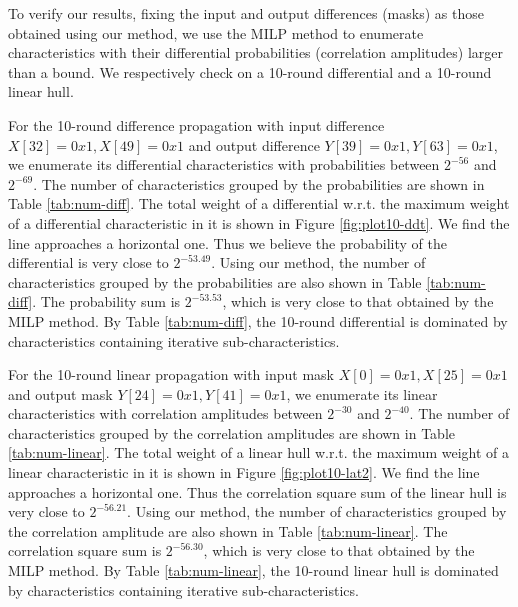 To verify our results, fixing the input and output differences (masks) as those obtained using our method, we use the MILP method to enumerate characteristics with their differential probabilities (correlation amplitudes) larger than a bound. We respectively check on a 10-round differential and a 10-round linear hull.

For the 10-round difference propagation with input difference $X[32]=0x1, X[49]=0x1$ and output difference $Y[39]=0x1, Y[63]=0x1$, we enumerate its differential characteristics with probabilities between $2^{-56}$ and $2^{-69}$. The number of characteristics grouped by the probabilities are shown in Table \ref{tab:num-diff}. The total weight of a differential w.r.t. the maximum weight of a differential characteristic in it is shown in Figure \ref{fig:plot10-ddt}. We find the line approaches a horizontal one. Thus we believe the probability of the differential is very close to $2^{-53.49}$. Using our method, the number of characteristics grouped by the probabilities are also shown in Table \ref{tab:num-diff}. The probability sum is $2^{-53.53}$, which is very close to that obtained by the MILP method. By Table \ref{tab:num-diff}, the 10-round differential is dominated by characteristics containing iterative sub-characteristics. 


For the 10-round linear propagation with input mask $X[0]=0x1, X[25]=0x1$ and output mask $Y[24]=0x1, Y[41]=0x1$, we enumerate its linear characteristics with correlation amplitudes between $2^{-30}$ and $2^{-40}$. The number of characteristics grouped by the correlation amplitudes are shown in Table \ref{tab:num-linear}. The total weight of a linear hull w.r.t. the maximum weight of a linear characteristic in it is shown in Figure \ref{fig:plot10-lat2}. We find the line approaches a horizontal one. Thus the correlation square sum of the linear hull is very close to $2^{-56.21}$. Using our method, the number of characteristics grouped by the correlation amplitude are also shown in Table \ref{tab:num-linear}. The correlation square sum is $2^{-56.30}$, which is very close to that obtained by the MILP method. By Table \ref{tab:num-linear}, the 10-round linear hull is dominated by characteristics containing iterative sub-characteristics. 

